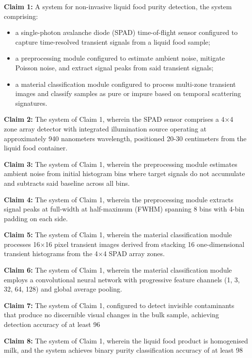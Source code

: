 \documentclass[11pt,a4paper]{article}
\begin{document}
\begin{enumerate}[leftmargin=*,label=\alph*)]
\textbf{Claim 1:} A system for non-invasive liquid food purity detection, the system comprising:
\begin{itemize}[leftmargin=*]
\item a single-photon avalanche diode (SPAD) time-of-flight sensor configured to capture time-resolved transient signals from a liquid food sample;
\item a preprocessing module configured to estimate ambient noise, mitigate Poisson noise, and extract signal peaks from said transient signals;
\item a material classification module configured to process multi-zone transient images and classify samples as pure or impure based on temporal scattering signatures.
\end{itemize}

\textbf{Claim 2:} The system of Claim 1, wherein the SPAD sensor comprises a 4$\times$4 zone array detector with integrated illumination source operating at approximately 940 nanometers wavelength, positioned 20-30 centimeters from the liquid food container.

\textbf{Claim 3:} The system of Claim 1, wherein the preprocessing module estimates ambient noise from initial histogram bins where target signals do not accumulate and subtracts said baseline across all bins.

\textbf{Claim 4:} The system of Claim 1, wherein the preprocessing module extracts signal peaks at full-width at half-maximum (FWHM) spanning 8 bins with 4-bin padding on each side.

\textbf{Claim 5:} The system of Claim 1, wherein the material classification module processes 16$\times$16 pixel transient images derived from stacking 16 one-dimensional transient histograms from the 4$\times$4 SPAD array zones.

\textbf{Claim 6:} The system of Claim 1, wherein the material classification module employs a convolutional neural network with progressive feature channels (1, 3, 32, 64, 128) and global average pooling.

\textbf{Claim 7:} The system of Claim 1, configured to detect invisible contaminants that produce no discernible visual changes in the bulk sample, achieving detection accuracy of at least 96%

\textbf{Claim 8:} The system of Claim 1, wherein the liquid food product is homogenised milk, and the system achieves binary purity classification accuracy of at least 98%


\end{enumerate}
\end{document}
